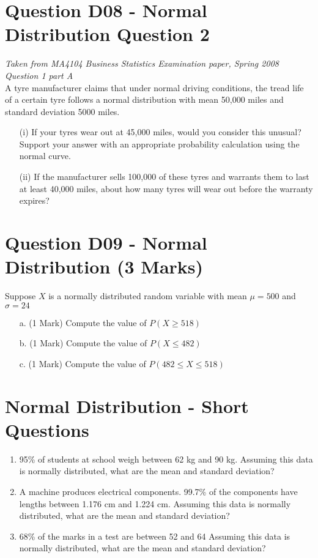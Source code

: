 \documentclass[]{report}
\begin{document}
\section{Question D08 - Normal Distribution Question 2}
\emph{Taken from MA4104 Business Statistics Examination paper, Spring 2008 Question 1 part A}\\


A tyre manufacturer claims that under normal driving conditions, the tread life of a certain tyre follows a normal distribution with mean 50,000 miles and standard deviation 5000 miles.

\begin{itemize}
	\item [(i)] If your tyres wear out at 45,000 miles, would you consider this unusual? Support your answer with an appropriate probability calculation using the normal curve. %
	
	\item [(ii)] If the manufacturer sells 100,000 of these tyres and warrants them to last at least 40,000 miles, about how many tyres will wear out before the warranty expires?%
\end{itemize}

\section{Question D09 - Normal Distribution (3 Marks)} %
Suppose $X$ is a normally distributed random variable with mean $\mu =500$ and $\sigma = 24$

\begin{itemize}
	\item[a.] (1 Mark) Compute the value of $P(X \geq 518)$
	\item[b.] (1 Mark) Compute the value of $P(X \leq 482)$
	\item[c.] (1 Mark) Compute the value of $P(482 \leq X \leq 518)$
\end{itemize}

\section{Normal Distribution - Short Questions}


\begin{enumerate}
	\item 95\% of students at school weigh between 62 kg and 90 kg.
	Assuming this data is normally distributed, what are the mean and standard deviation?
	
	\item A machine produces electrical components.
	99.7\% of the components have lengths between 1.176 cm and 1.224 cm.
	Assuming this data is normally distributed, what are the mean and standard deviation?
	
	\item 68\% of the marks in a test are between 52 and 64
	Assuming this data is normally distributed, what are the mean and standard deviation?
\end{enumerate}
\end{document}
